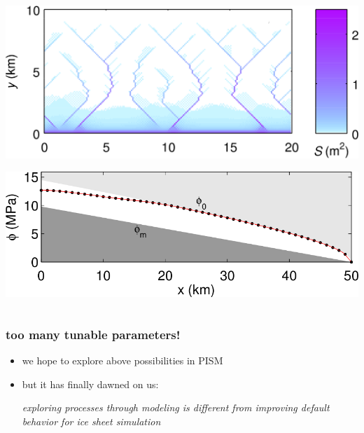 \documentclass[hide notes,intlimits]{beamer}
\begin{document}
\begin{frame}
\begin{columns}
\begin{column}{0.4\textwidth}
\begin{center}
\vspace{4mm}

\includegraphics[width=1.0\textwidth]{figs/schoof-channels}

\vspace{5mm}

\includegraphics[width=1.0\textwidth]{figs/schoof-overburden}
\end{center}
\end{column}
\end{columns}

\end{frame}


\begin{frame}
  \frametitle{too many tunable parameters!}

  \begin{itemize}
  \item we hope to explore above possibilities in PISM
  \item but it has finally dawned on us:
  
  \begin{center}
  \emph{exploring processes through modeling is different from improving default behavior for ice sheet simulation}
  \end{center}
  \end{itemize}
\end{frame}
\end{document}
